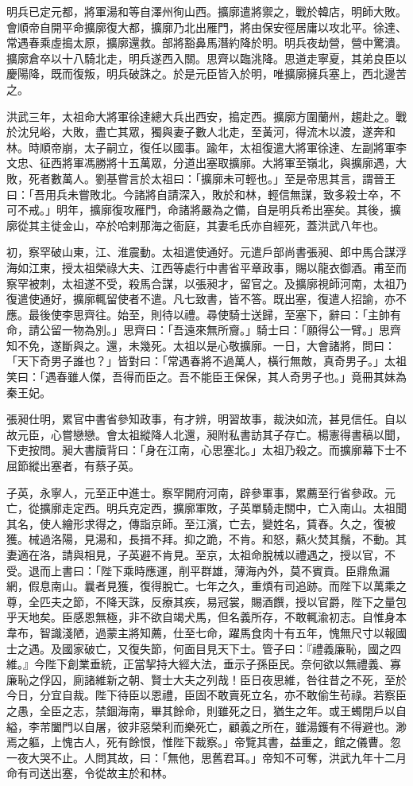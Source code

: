 明兵已定元都，將軍湯和等自澤州徇山西。擴廓遣將禦之，戰於韓店，明師大敗。會順帝自開平命擴廓復大都，擴廓乃北出雁門，將由保安徑居庸以攻北平。徐達、常遇春乘虛搗太原，擴廓還救。部將豁鼻馬潛約降於明。明兵夜劫營，營中驚潰。擴廓倉卒以十八騎北走，明兵遂西入關。思齊以臨洮降。思道走寧夏，其弟良臣以慶陽降，既而復叛，明兵破誅之。於是元臣皆入於明，唯擴廓擁兵塞上，西北邊苦之。

洪武三年，太祖命大將軍徐達總大兵出西安，搗定西。擴廓方圍蘭州，趨赴之。戰於沈兒峪，大敗，盡亡其眾，獨與妻子數人北走，至黃河，得流木以渡，遂奔和林。時順帝崩，太子嗣立，復任以國事。踰年，太祖復遣大將軍徐達、左副將軍李文忠、征西將軍馮勝將十五萬眾，分道出塞取擴廓。大將軍至嶺北，與擴廓遇，大敗，死者數萬人。劉基嘗言於太祖曰：「擴廓未可輕也。」至是帝思其言，謂晉王曰：「吾用兵未嘗敗北。今諸將自請深入，敗於和林，輕信無謀，致多殺士卒，不可不戒。」明年，擴廓復攻雁門，命諸將嚴為之備，自是明兵希出塞矣。其後，擴廓從其主徙金山，卒於哈剌那海之衙庭，其妻毛氏亦自經死，蓋洪武八年也。

初，察罕破山東，江、淮震動。太祖遣使通好。元遣戶部尚書張昶、郎中馬合謀浮海如江東，授太祖榮祿大夫、江西等處行中書省平章政事，賜以龍衣御酒。甫至而察罕被刺，太祖遂不受，殺馬合謀，以張昶才，留官之。及擴廓視師河南，太祖乃復遣使通好，擴廓輒留使者不遣。凡七致書，皆不答。既出塞，復遣人招諭，亦不應。最後使李思齊往。始至，則待以禮。尋使騎士送歸，至塞下，辭曰：「主帥有命，請公留一物為別。」思齊曰：「吾遠來無所齎。」騎士曰：「願得公一臂。」思齊知不免，遂斷與之。還，未幾死。太祖以是心敬擴廓。一日，大會諸將，問曰：「天下奇男子誰也？」皆對曰：「常遇春將不過萬人，橫行無敵，真奇男子。」太祖笑曰：「遇春雖人傑，吾得而臣之。吾不能臣王保保，其人奇男子也。」竟冊其妹為秦王妃。

張昶仕明，累官中書省參知政事，有才辨，明習故事，裁決如流，甚見信任。自以故元臣，心嘗戀戀。會太祖縱降人北還，昶附私書訪其子存亡。楊憲得書稿以聞，下吏按問。昶大書牘背曰：「身在江南，心思塞北。」太祖乃殺之。而擴廓幕下士不屈節縱出塞者，有蔡子英。

子英，永寧人，元至正中進士。察罕開府河南，辟參軍事，累薦至行省參政。元亡，從擴廓走定西。明兵克定西，擴廓軍敗，子英單騎走關中，亡入南山。太祖聞其名，使人繪形求得之，傳詣京師。至江濱，亡去，變姓名，賃舂。久之，復被獲。械過洛陽，見湯和，長揖不拜。抑之跪，不肯。和怒，爇火焚其鬚，不動。其妻適在洛，請與相見，子英避不肯見。至京，太祖命脫械以禮遇之，授以官，不受。退而上書曰：「陛下乘時應運，削平群雄，薄海內外，莫不賓貢。臣鼎魚漏網，假息南山。曩者見獲，復得脫亡。七年之久，重煩有司追跡。而陛下以萬乘之尊，全匹夫之節，不降天誅，反療其疾，易冠裳，賜酒饌，授以官爵，陛下之量包乎天地矣。臣感恩無極，非不欲自竭犬馬，但名義所存，不敢輒渝初志。自惟身本韋布，智識淺陋，過蒙主將知薦，仕至七命，躍馬食肉十有五年，愧無尺寸以報國士之遇。及國家破亡，又復失節，何面目見天下士。管子曰：『禮義廉恥，國之四維。』今陛下創業垂統，正當挈持大經大法，垂示子孫臣民。奈何欲以無禮義、寡廉恥之俘囚，廁諸維新之朝、賢士大夫之列哉！臣日夜思維，咎往昔之不死，至於今日，分宜自裁。陛下待臣以恩禮，臣固不敢賣死立名，亦不敢偷生茍祿。若察臣之愚，全臣之志，禁錮海南，畢其餘命，則雖死之日，猶生之年。或王蠋閉戶以自縊，李芾闔門以自屠，彼非惡榮利而樂死亡，顧義之所在，雖湯鑊有不得避也。渺焉之軀，上愧古人，死有餘恨，惟陛下裁察。」帝覽其書，益重之，館之儀曹。忽一夜大哭不止。人問其故，曰：「無他，思舊君耳。」帝知不可奪，洪武九年十二月命有司送出塞，令從故主於和林。

